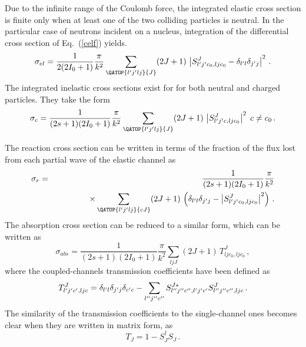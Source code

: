 Due to the infinite range of the Coulomb force, the integrated elastic cross
section is finite only when at least one of the two colliding particles is
neutral. In the particular case of neutrons incident on a nucleus,
integration of the differential cross section of Eq.~(\ref{celf}) yields.
\begin{equation}
\sigma_{el}=\frac{1}{2(2I_{0}+1)}\frac{\pi}{k^{2}}\sum_{{{\QATOP{%
l^{\prime}j^{\prime}lj}{J}}}}(2J+1)\,\left|S_{l^{\prime}j^{%
\prime}c_{0},ljc_{0}}^{J}-\delta_{l^{\prime}l}\delta_{j^{\prime}j}%
\right|^{2}\,.
\end{equation}
The integrated inelastic cross sections exist for for both neutral and
charged particles. They take the form
\begin{equation}
\sigma_{c}=\frac{1}{(2s+1)(2I_{0}+1)}\frac{\pi}{k^{2}}\sum_{{{\QATOP{%
l^{\prime}j^{\prime}lj}{J}}}}(2J+1)\,\left|S_{l^{\prime}j^{%
\prime}c,ljc_{0}}^{J}\right|^{2}\; c\neq c_{0}\,.
\end{equation}

The reaction cross section can be written in terms of the fraction of the
flux lost from each partial wave of the elastic channel as
\begin{eqnarray}
\sigma_{r} & = & \frac{1}{(2s+1)(2I_{0}+1)}\frac{\pi}{k^{2}} \\
& & \qquad\qquad\times\sum_{{{\QATOP{l^{\prime}j^{\prime}lj}{cJ}}}%
}(2J+1)\,\left(\delta_{l^{\prime}l}\delta_{j^{\prime}j}-\left|S_{l^{%
\prime}j^{\prime}c_{0},ljc_{0}}^{J}\right|^{2}\right)\,.  \notag
\end{eqnarray}
The absorption cross section can be reduced to a similar form, which can be
written as
\begin{equation}
\sigma_{abs}=\frac{1}{(2s+1)(2I_{0}+1)}\frac{\pi}{k^{2}}\sum_{ljJ}(2J+1)\,
T_{ljc_{0},ljc_{0}}^{J}\,,
\end{equation}
where the coupled-channels transmission coefficients have been defined as
\begin{equation}
T_{l^{\prime}j^{\prime}c^{\prime},ljc}^{J}=\delta_{l^{\prime}l}\delta_{j^{%
\prime}j}\delta_{c^{\prime}c}-\sum_{l^{\prime\prime}j^{\prime\prime}c^{%
\prime\prime}}S_{l^{\prime\prime}j^{\prime\prime}c^{\prime\prime},l^{%
\prime}j^{\prime}c^{\prime}}^{J*}S_{l^{\prime\prime}j^{\prime\prime}c^{%
\prime\prime},ljc}^{J}\,.
\end{equation}
The similarity of the transmission coefficients to the single-channel ones
becomes clear when they are written in matrix form, as
\begin{equation}
T_{J}=1-S_{J}^{\dagger}S_{J}\,.
\end{equation}

